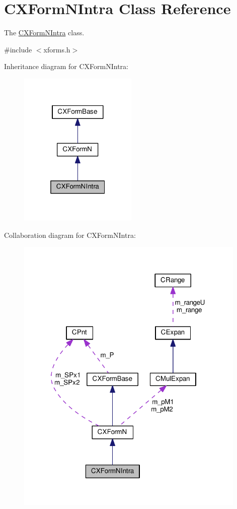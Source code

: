 \hypertarget{classCXFormNIntra}{\section{C\-X\-Form\-N\-Intra Class Reference}
\label{classCXFormNIntra}
}


The \hyperlink{classCXFormNIntra}{C\-X\-Form\-N\-Intra} class.  




{\ttfamily \#include $<$xforms.\-h$>$}



Inheritance diagram for C\-X\-Form\-N\-Intra\-:\nopagebreak
\begin{figure}[H]
\begin{center}
\leavevmode
\includegraphics[width=160pt]{classCXFormNIntra__inherit__graph}
\end{center}
\end{figure}


Collaboration diagram for C\-X\-Form\-N\-Intra\-:\nopagebreak
\begin{figure}[H]
\begin{center}
\leavevmode
\includegraphics[width=311pt]{classCXFormNIntra__coll__graph}
\end{center}
\end{figure}

